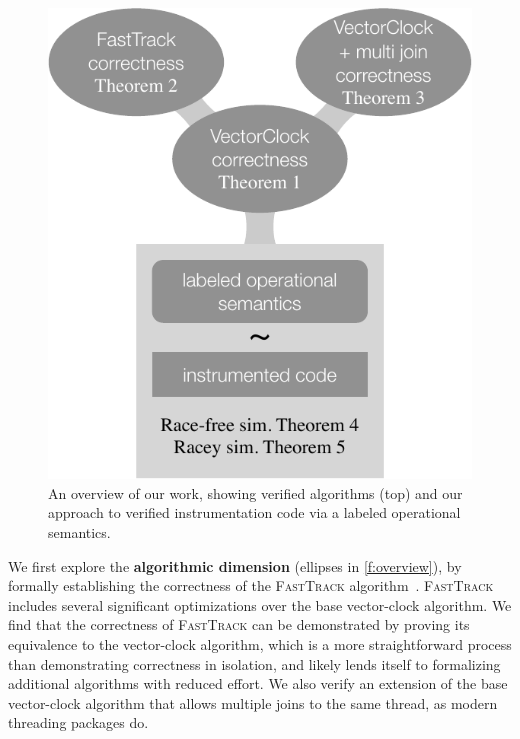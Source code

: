 \documentclass[preprint, 9pt]{sigplanconf}
\newcommand{\FT}{\textsc{FastTrack}\xspace}
\begin{document}
\begin{figure}[t]
\centering
 \includegraphics[width=0.6\columnwidth]{overview.pdf}
 \caption{An overview of our work, showing verified algorithms (top) and our approach to verified instrumentation code via a labeled operational semantics.}
 \label{f:overview}
\end{figure}

We first explore the \textbf{algorithmic dimension} (ellipses in \autoref{f:overview}), by formally establishing the correctness of the \FT algorithm~\cite{fasttrack}. \FT includes several significant optimizations over the base vector-clock algorithm. We find that the correctness of \FT can be demonstrated by proving its equivalence to the vector-clock algorithm, which is a more straightforward process than demonstrating correctness in isolation, and likely lends itself to formalizing additional algorithms with reduced effort.
We also verify an extension of the base vector-clock algorithm that allows multiple joins to the same thread, as modern threading packages do.
\end{document}
